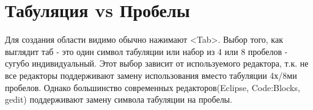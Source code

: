 \section{  Табуляция vs Пробелы }

Для создания области видимо обычно нажимают <Tab>. Выбор того, как выглядит таб - это один символ табуляции или набор из 4 или 8 пробелов - сугубо индивидуальный. Этот выбор зависит от используемого редактора, т.к. не все редакторы поддерживают замену использования вместо табуляции 4х/8ми пробелов. Однако большинство современных редакторов(Eclipse, Code:Blocks, gedit) поддерживают замену символа табуляции на пробелы.

